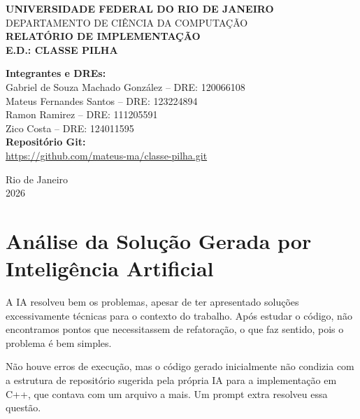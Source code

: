\documentclass[12pt,a4paper]{article}
\begin{document}
\begin{titlepage}
    \centering
    \vspace*{1cm}
    {\Large \textbf{UNIVERSIDADE FEDERAL DO RIO DE JANEIRO}}\\[0.3cm]
    {\large DEPARTAMENTO DE CIÊNCIA DA COMPUTAÇÃO}\\[2.5cm]
    
    {\Large \textbf{RELATÓRIO DE IMPLEMENTAÇÃO}}\\[0.5cm]
    {\LARGE \textbf{E.D.: CLASSE PILHA}}\\[2.5cm]
    
    \begin{flushright}
    \begin{minipage}{0.68\textwidth}
        \textbf{Integrantes e DREs:}\\[0.4cm]
        Gabriel de Souza Machado González -- DRE: 120066108\\[0.2cm]
        Mateus Fernandes Santos -- DRE: 123224894\\[0.2cm]
        Ramon Ramirez -- DRE: 111205591\\[0.2cm]
        Zico Costa -- DRE: 124011595\\[0.8cm]
        \textbf{Repositório Git:}\\
        \url{https://github.com/mateus-ma/classe-pilha.git}
    \end{minipage}
    \end{flushright}
    
    \vfill
    {\large Rio de Janeiro}\\[0.2cm]
    {\large 2026}
\end{titlepage}

\newpage
{}

\section{Análise da Solução Gerada por Inteligência Artificial}

A IA resolveu bem os problemas, apesar de ter apresentado soluções excessivamente técnicas para o contexto do trabalho. Após estudar o código, não encontramos pontos que necessitassem de refatoração, o que faz sentido, pois o problema é bem simples.

Não houve erros de execução, mas o código gerado inicialmente não condizia com a estrutura de repositório sugerida pela própria IA para a implementação em C++, que contava com um arquivo a mais. Um prompt extra resolveu essa questão.
\end{document}

